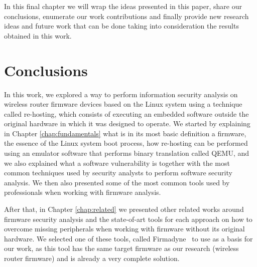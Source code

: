 

    

In this final chapter we will wrap the ideas presented in this paper, share our conclusions, enumerate our work contributions and finally provide new research ideas and future work that can be done taking into consideration the results obtained in this work.

\section{Conclusions}

In this work, we explored a way to perform information security analysis on wireless router firmware devices based on the Linux system using a technique called re-hosting, which consists of executing an embedded software outside the original hardware in which it was designed to operate. We started by explaining in Chapter \ref{chap:fundamentals} what is in its most basic definition a firmware, the essence of the Linux system boot process, how re-hosting can be performed using an emulator software that performs binary translation called QEMU, and we also explained what a software vulnerability is together with the most common techniques used by security analysts to perform software security analysis. We then also presented some of the most common tools used by professionals when working with firmware analysis.

After that, in Chapter \ref{chap:related} we presented other related works around firmware security analysis and the state-of-art tools for each approach on how to overcome missing peripherals when working with firmware without its original hardware. We selected one of these tools, called Firmadyne~\cite{firmadyne} to use as a basis for our work, as this tool has the same target firmware as our research (wireless router firmware) and is already a very complete solution.

